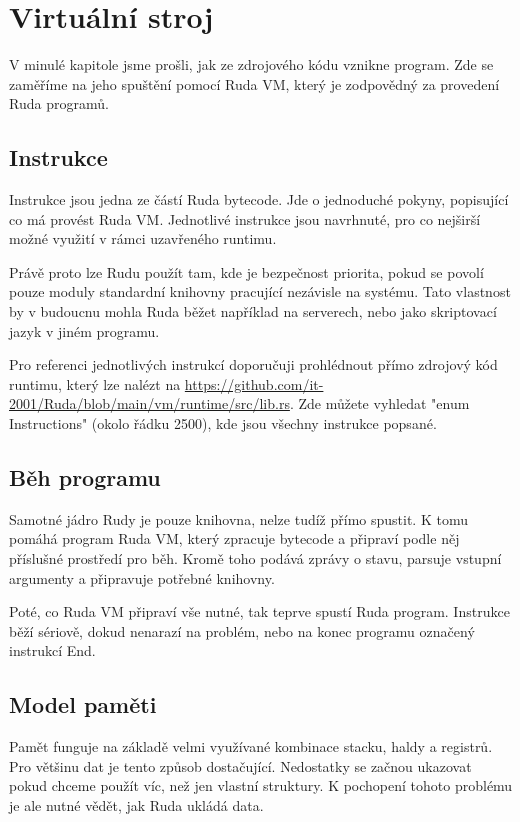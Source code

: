 \documentclass[12pt, a4paper,
twoside,        %
openright
]{report}
\let\oldchapter\chapter
\renewcommand{\chapter}{
	\clearpage
	\pagestyle{fancy}
	\oldchapter
}
\begin{document}
	\chapter{Virtuální stroj}
	
	V minulé kapitole jsme prošli, jak ze zdrojového kódu vznikne program. Zde se zaměříme na jeho spuštění pomocí Ruda VM, který je zodpovědný za provedení Ruda programů.
	
	
	\section{Instrukce}
	
	Instrukce jsou jedna ze částí Ruda bytecode. Jde o jednoduché pokyny, popisující co má provést Ruda VM. Jednotlivé instrukce jsou navrhnuté, pro co nejširší možné využití v rámci uzavřeného runtimu. 
	
	Právě proto lze Rudu použít tam, kde je bezpečnost priorita, pokud se povolí pouze moduly standardní knihovny pracující nezávisle na systému. Tato vlastnost by v budoucnu mohla Ruda běžet například na serverech, nebo jako skriptovací jazyk v jiném programu.
	
	Pro referenci jednotlivých instrukcí doporučuji prohlédnout přímo zdrojový kód runtimu, který lze nalézt na \url{https://github.com/it-2001/Ruda/blob/main/vm/runtime/src/lib.rs}. Zde můžete vyhledat "enum Instructions" (okolo řádku 2500), kde jsou všechny instrukce popsané.
	
	\section{Běh programu}
	
	Samotné jádro Rudy je pouze knihovna, nelze tudíž přímo spustit. K tomu pomáhá program Ruda VM, který zpracuje bytecode a připraví podle něj příslušné prostředí pro běh. Kromě toho podává zprávy o stavu, parsuje vstupní argumenty a připravuje potřebné knihovny.
	
	Poté, co Ruda VM připraví vše nutné, tak teprve spustí Ruda program. Instrukce běží sériově, dokud nenarazí na problém, nebo na konec programu označený instrukcí End.
	
	\clearpage
	\section{Model paměti}
	
	Pamět funguje na základě velmi využívané kombinace stacku, haldy a registrů. Pro většinu dat je tento způsob dostačující. Nedostatky se začnou ukazovat pokud chceme použít víc, než jen vlastní struktury. K pochopení tohoto problému je ale nutné vědět, jak Ruda ukládá data.
	
\end{document}

